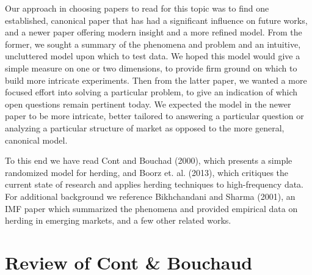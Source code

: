 \documentclass{article}
\begin{document}
Our approach in choosing papers to read for this topic was to find one established, canonical paper that has had a significant influence on future works, and a newer paper offering modern insight and a more refined model.
From the former, we sought a summary of the phenomena and problem and an intuitive, uncluttered model upon which to test data.
We hoped this model would give a simple measure on one or two dimensions, to provide firm ground on which to build more intricate experiments.
Then from the latter paper, we wanted a more focused effort into solving a particular problem, to give an indication of which open questions remain pertinent today.
We expected the model in the newer paper to be more intricate, better tailored to answering a particular question or analyzing a particular structure of market as opposed to the more general, canonical model.

To this end we have read Cont and Bouchad (2000), which presents a simple randomized model for herding, and Boorz et. al. (2013), which critiques the current state of research and applies herding techniques to high-frequency data.
For additional background we reference Bikhchandani and Sharma (2001), an IMF paper which summarized the phenomena and provided empirical data on herding in emerging markets, and a few other related works.

\section{Review of Cont \& Bouchaud}
\end{document}
